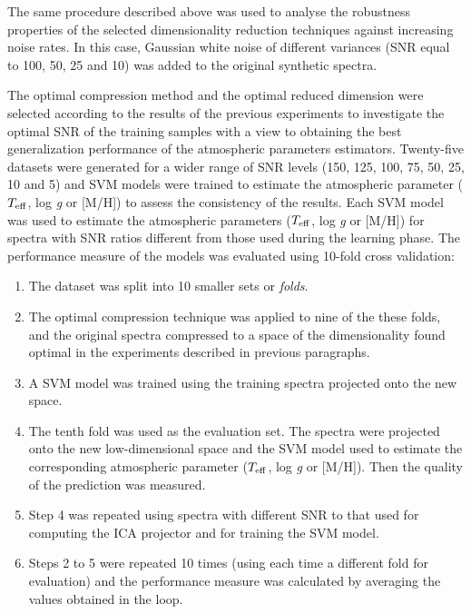 \documentclass[a4paper,fleqn,usenatbib]{mnras}
\begin{document}
The same procedure described above was used to analyse the 
  robustness properties of the selected dimensionality reduction
techniques against increasing noise rates. In this case,
Gaussian white noise of different variances (SNR equal to 100,
50, 25 and 10) was added to the original synthetic spectra.
 
The optimal compression method and the optimal reduced
  dimension were selected according to the results of the previous
  experiments to investigate the optimal SNR of the training samples
  with a view to obtaining the best generalization performance of the
  atmospheric parameters estimators. Twenty-five datasets were
  generated for a wider range of SNR levels (150, 125, 100, 75, 50,
  25, 10 and 5) and SVM models were trained to estimate the atmospheric 
  parameter ($T_{\rm eff}$, log \textit{g} or [M/H]) to
  assess the consistency of the results. Each SVM model was used to
  estimate the atmospheric parameters ($T_{\rm eff}$, 
  log \textit{g} or [M/H]) for spectra with SNR ratios different from
  those used during the learning phase.  The performance measure of
  the models was evaluated using 10-fold cross validation:

\begin{enumerate}
\item The dataset was split into 10 smaller sets or \textit{folds}.
\item The optimal compression technique was applied to nine of
  the these folds, and the original spectra compressed to a space
  of the dimensionality found optimal in the experiments described in
  previous paragraphs.
\item A SVM model was trained using the training spectra projected
  onto the new space.
\item The tenth fold was used as the evaluation set. The spectra
  were projected onto the new low-dimensional space and the
    SVM model used to estimate the corresponding  atmospheric parameter 
    ($T_{\rm eff}$, log \textit{g} or [M/H]). Then the
  quality of the prediction was measured.
\item Step 4 was repeated using spectra with different SNR to that
  used for computing the ICA projector and for training the SVM model.
\item Steps 2 to 5 were repeated 10 times (using each time a
  different fold for evaluation) and the performance measure was
  calculated by averaging the values obtained in the loop.
\end{enumerate}
\end{document}
